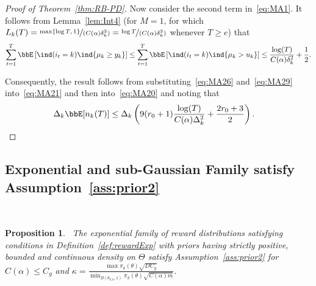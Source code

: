 \documentclass[11pt]{article}
\newtheorem{proposition}[theorem]{Proposition}
\begin{document}
\begin{proof}[Proof of Theorem~\ref{thm:RB-PD}]
Now consider the second term in~\eqref{eq:MA1}. It follows from Lemma~\ref{lem:Int4} (for $M=1$, for which $L_k(T)=\nicefrac{\max\{\log T,\,1\}}{(C(\alpha)\delta_k^2)}=\nicefrac{\log T}{(C(\alpha)\delta_k^2)}$ whenever $T \geq e$) that
\begin{align}
    \sum_{t=1}^{T}\bbE\left[  \ind(i_t=k )  \ind\{\mu_k \geq y_k  \}   \right]  \leq \sum_{t=1}^{T}\bbE\left[  \ind(i_t=k )  \ind\{\mu_k > u_k  \}   \right]   \leq \frac{\log(T)}{C(\alpha)\delta_k^2}  + \frac{1}{2}.
    \label{eq:MA29}
\end{align}

Consequently, the result follows from substituting~\eqref{eq:MA26} and~\eqref{eq:MA29} into~\eqref{eq:MA21} and then into~\eqref{eq:MA20} and noting that 
\begin{align}
    \Delta_k  \bbE[n_k(T)] &\leq  \Delta_k  \left(9(r_0+1)  \frac{\log(T)}{C(\alpha)\Delta_k^2}  + \frac{2r_0+3}{2} \right).
\end{align}
\end{proof}
\subsection{Exponential and sub-Gaussian Family satisfy Assumption~\ref{ass:prior2}}~\label{App:Assumption34}

\begin{proposition}~\label{prop:ExpG}
    The exponential family of reward distributions satisfying conditions in Definition~\ref{def:rewardExp} with priors having strictly positive, bounded  and continuous density on $\Theta$ satisfy Assumption~\ref{ass:prior2}  for $C(\alpha)\leq C_g$ and $\kappa= \frac{\max \pi_k(\theta) \sqrt{DC_g}}{\min_{B(\theta_{0,k},1)} \pi_k(\theta) \sqrt{C(\alpha)m}}$.
\end{proposition}
\end{document}
